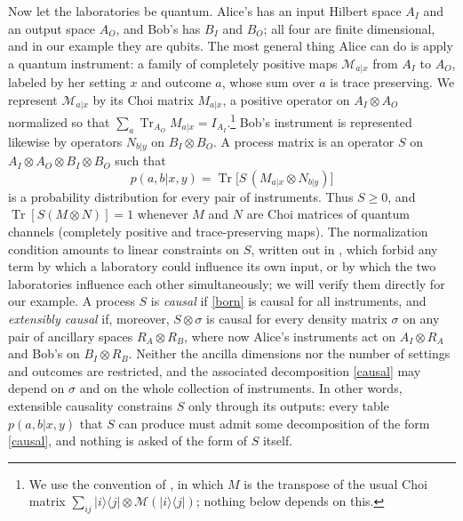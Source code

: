 \documentclass[aps,prl,reprint,superscriptaddress,nofootinbib,longbibliography,raggedbottom]{revtex4-2}
\DeclareMathOperator{\Tr}{Tr}
\newcommand{\ket}[1]{\lvert #1\rangle}
\newcommand{\bra}[1]{\langle #1\rvert}
\begin{document}
Now let the laboratories be quantum. Alice's has an input Hilbert space
$A_I$ and an output space $A_O$, and Bob's has $B_I$ and $B_O$; all four
are finite dimensional, and in our example they are qubits. The most
general thing Alice can do is apply a quantum instrument: a family of
completely positive maps $\mathcal M_{a|x}$ from $A_I$ to $A_O$, labeled by
her setting $x$ and outcome $a$, whose sum over $a$ is trace preserving. We
represent $\mathcal M_{a|x}$ by its Choi matrix $M_{a|x}$, a positive
operator on $A_I\otimes A_O$ normalized so that
$\sum_a\Tr_{A_O}M_{a|x}=I_{A_I}$.\footnote{We use the convention of
\cite{OCB}, in which $M$ is the transpose of the usual Choi matrix
$\sum_{ij}\ket i\bra j\otimes\mathcal M(\ket i\bra j)$; nothing below
depends on this.} Bob's instrument is represented likewise by operators
$N_{b|y}$ on $B_I\otimes B_O$. A process matrix is an operator $S$ on
$A_I\otimes A_O\otimes B_I\otimes B_O$ such that
\begin{equation}\label{born}
p(a,b|x,y)=\Tr\bigl[S\,(M_{a|x}\otimes N_{b|y})\bigr]
\end{equation}
is a probability distribution for every pair of instruments. Thus
$S\geq0$, and $\Tr[S(M\otimes N)]=1$ whenever $M$ and $N$ are Choi matrices
of quantum channels (completely positive and trace-preserving maps).
The normalization condition amounts to linear
constraints on $S$, written out in \cite{OCB}, which forbid any term by
which a laboratory could influence its own input, or by which the two
laboratories influence each other simultaneously; we will verify them
directly for our example. A process $S$ is \emph{causal} if \eqref{born}
is causal for all instruments, and \emph{extensibly causal} \cite{OG} if,
moreover, $S\otimes\sigma$ is causal for every density matrix $\sigma$ on
any pair of ancillary spaces $R_A\otimes R_B$, where now Alice's
instruments act on $A_I\otimes R_A$ and Bob's on $B_I\otimes R_B$. Neither
the ancilla dimensions nor the number of settings and outcomes are
restricted, and the associated decomposition \eqref{causal} may depend on $\sigma$ and
on the whole collection of instruments. In other words, extensible
causality constrains $S$ only through its outputs: every table
$p(a,b|x,y)$ that $S$ can produce must admit some decomposition of the
form \eqref{causal}, and nothing is asked of the form of $S$ itself.
\end{document}
